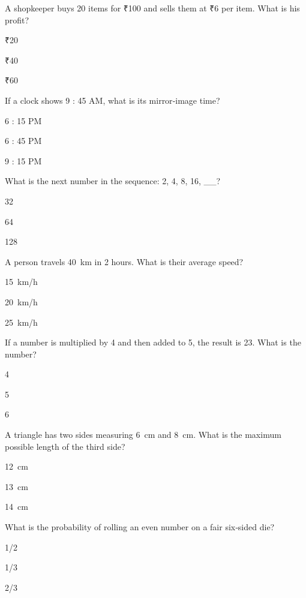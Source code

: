 \begin{enhancedmcq}{A shopkeeper buys 20 items for ₹100 and sells them at ₹6 per item. What is his profit?}
\item ₹20
\item ₹40
\item ₹60

\end{enhancedmcq}
\begin{enhancedmcq}{If a clock shows 9 : 45 AM, what is its mirror‑image time?}
\item 6 : 15 PM
\item 6 : 45 PM
\item 9 : 15 PM

\end{enhancedmcq}
\begin{enhancedmcq}{What is the next number in the sequence: 2, 4, 8, 16, __?}
\item 32
\item 64
\item 128

\end{enhancedmcq}
\begin{enhancedmcq}{A person travels 40 km in 2 hours. What is their average speed?}
\item 15 km/h
\item 20 km/h
\item 25 km/h

\end{enhancedmcq}
\begin{enhancedmcq}{If a number is multiplied by 4 and then added to 5, the result is 23. What is the number?}
\item 4
\item 5
\item 6

\end{enhancedmcq}
\begin{enhancedmcq}{A triangle has two sides measuring 6 cm and 8 cm. What is the maximum possible length of the third side?}
\item 12 cm
\item 13 cm
\item 14 cm

\end{enhancedmcq}
\begin{enhancedmcq}{What is the probability of rolling an even number on a fair six‑sided die?}
\item 1/2
\item 1/3
\item 2/3

\end{enhancedmcq}
